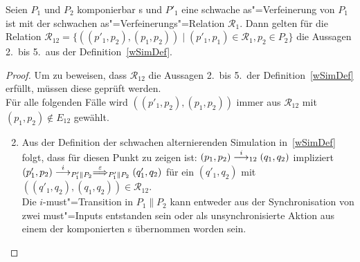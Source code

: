 \begin{Lem}
  \label{schwVerfParallelLem}
  Seien $P_1$ und $P_2$ komponierbar \MEIO{}s und $P'_1$ eine schwache
  as"=Verfeinerung von $P_1$ ist mit der schwachen as"=Verfeinerungs"=Relation
  $\mathcal{R}_1$. Dann gelten für die Relation $\mathcal{R}_{12} =
  \{((p'_1,p_2),(p_1,p_2))\mid (p'_1,p_1)\in\mathcal{R}_1, p_2\in P_2\}$ die
  Aussagen 2.\ bis 5.\ aus der Definition~\ref{wSimDef}.
\end{Lem}
\begin{proof}
  Um zu beweisen, dass $\mathcal{R}_{12}$ die Aussagen 2.\ bis 5.\ der
  Definition~\ref{wSimDef} erfüllt, müssen diese geprüft werden.\\
  Für alle folgenden Fälle wird $((p'_1,p_2),(p_1,p_2))$ immer aus
  $\mathcal{R}_{12}$ mit $(p_1,p_2)\notin E_{12}$ gewählt.
  \begin{enumerate}
    \setcounter{enumi}{1}
    \item Aus der Definition der schwachen alternierenden
      Simulation in~\ref{wSimDef} folgt, dass für diesen Punkt zu zeigen ist:
      $(p_1,p_2)\must[i]_{12}(q_1,q_2)$ impliziert $(p'_1,p_2)
      \must[i]_{P'_1\|P_2} \weakmust[\varepsilon]_{P'_1\|P_2} (q'_1,q_2)$
      für ein $(q'_1,q_2)$ mit $((q'_1,q_2),(q_1,q_2)) \in \mathcal{R}_{12}$.\\
      Die $i$-must"=Transition in $P_1\|P_2$ kann entweder aus der
      Synchronisation von zwei must"=Inputs entstanden sein oder als
      unsynchronisierte Aktion aus einem der komponierten \MEIO{}s übernommen
      worden sein.
\end{enumerate}
\end{proof}
